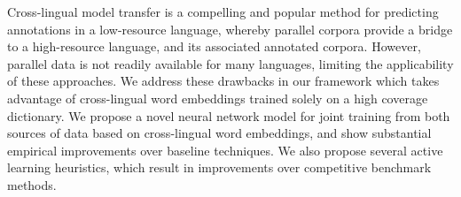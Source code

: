 Cross-lingual model transfer is a compelling and popular method for predicting annotations in a low-resource language, whereby parallel corpora provide a bridge to a high-resource language, and its associated annotated corpora. However, parallel data is not readily available for many languages, limiting the applicability of these approaches. We address these drawbacks in our framework which takes advantage of cross-lingual word embeddings trained solely on a high coverage dictionary. We propose a novel neural network model for joint training from both sources of data based on cross-lingual word embeddings, and show substantial empirical improvements over baseline techniques. We also propose several active learning heuristics, which result in improvements over competitive benchmark methods.

